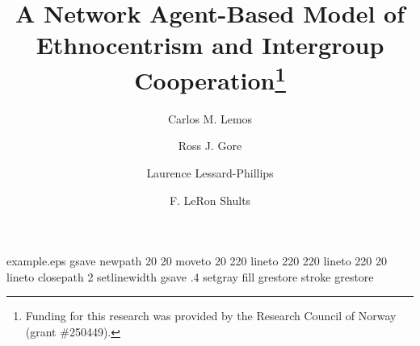 %
%
%
%
%
\begin{filecontents*}{example.eps}
gsave
newpath
  20 20 moveto
  20 220 lineto
  220 220 lineto
  220 20 lineto
closepath
2 setlinewidth
gsave
  .4 setgray fill
grestore
stroke
grestore
\end{filecontents*}
%
\RequirePackage{fix-cm}
%
\documentclass[smallcondensed]{svjour3}     %
%
\smartqed  %
%
\usepackage{graphicx}
%
\usepackage{mathptmx}      %
%
\usepackage{adjustbox}
\usepackage{amssymb}
\usepackage{newtxmath}
\usepackage{amsmath}  
%
%
%


\title{A Network Agent-Based Model of Ethnocentrism and Intergroup Cooperation\thanks{Funding for this research was provided by the Research Council of Norway (grant \#250449).}
}


\author{Carlos M. Lemos \and
	Ross J. Gore \and
	Laurence Lessard-Phillips \and 
	F. LeRon Shults%
}


